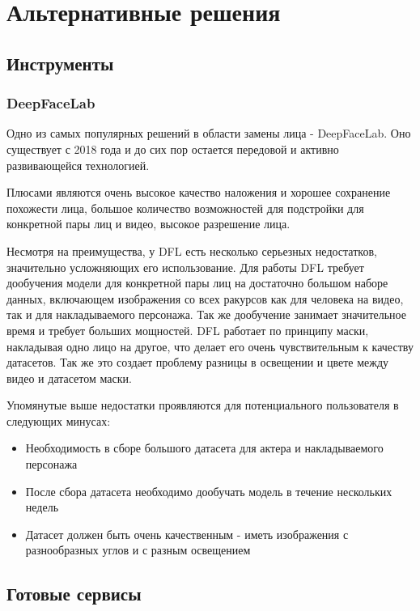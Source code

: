\section{Альтернативные решения}

\subsection*{Инструменты}

\subsubsection{DeepFaceLab}

Одно из самых популярных решений в области замены лица - DeepFaceLab\cite{deepfacelab}. Оно существует с 2018 года и до сих пор остается передовой и активно развивающейся технологией.

Плюсами являются очень высокое качество наложения и хорошее сохранение похожести лица, большое количество возможностей для подстройки для конкретной пары лиц и видео, высокое разрешение лица.

Несмотря на преимущества, у DFL есть несколько серьезных недостатков, значительно усложняющих его использование. Для работы DFL требует дообучения модели для конкретной пары лиц на достаточно большом наборе данных, включающем изображения со всех ракурсов как для человека на видео, так и для накладываемого персонажа.
Так же дообучение занимает значительное время и требует больших мощностей.
DFL работает по принципу маски, накладывая одно лицо на другое, что делает его очень чувствительным к качеству датасетов. Так же это создает проблему разницы в освещении и цвете между видео и датасетом маски.

Упомянутые выше недостатки проявляются для потенциального пользователя в следующих минусах:
\begin{itemize}
    \item Необходимость в сборе большого датасета для актера и накладываемого персонажа
    \item После сбора датасета необходимо дообучать модель в течение нескольких недель
    \item Датасет должен быть очень качественным - иметь изображения с разнообразных углов и с разным освещением
\end{itemize}

\subsection*{Готовые сервисы}

